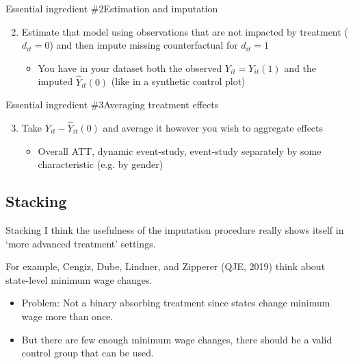 \documentclass[t]{beamer}
\begin{document}
\begin{frame}{Essential ingredient \#2}{Estimation and imputation}
  \begin{enumerate}
    \setcounter{enumi}{1}
    \item Estimate that model using observations that are not impacted by treatment ($d_{it} = 0$) and then impute missing counterfactual for $d_{it} = 1$
    \begin{itemize}
      \item You have in your dataset both the observed $Y_{it} = Y_{it}(1)$ and the imputed $\hat{Y}_{it}(0)$ (like in a synthetic control plot)
    \end{itemize}
  \end{enumerate}
\end{frame}

\begin{frame}{Essential ingredient \#3}{Averaging treatment effects}
  \begin{enumerate}
    \setcounter{enumi}{2}
    \item Take $Y_{it} - \hat{Y}_{it}(0)$ and average it however you wish to aggregate effects
    \begin{itemize}
      \item Overall ATT, dynamic event-study, event-study separately by some characteristic (e.g. by gender) 
    \end{itemize}
  \end{enumerate}
\end{frame}


\subsection{Stacking}

\begin{frame}{Stacking}
  I think the usefulness of the imputation procedure really shows itself in `more advanced treatment' settings.

  \bigskip
  For example, Cengiz, Dube, Lindner, and Zipperer (QJE, 2019) think about state-level minimum wage changes.
  \begin{itemize}
    \item Problem: Not a binary absorbing treatment since states change minimum wage more than once.

    \item But there are few enough minimum wage changes, there should be a valid control group that can be used.
  \end{itemize}
\end{frame}
\end{document}
